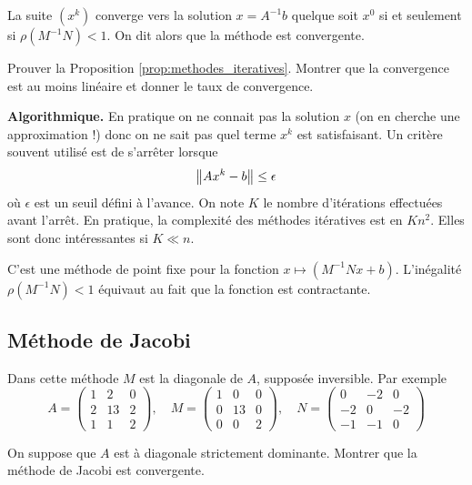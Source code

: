 \begin{proposition}
\label{prop:methodes_iteratives}
La suite $(x^k)$ converge vers la solution $x=A^{-1}b$ quelque soit $x^0$ si
et seulement si $\rho(M^{-1}N) < 1$. On dit alors que la méthode est
convergente.
\end{proposition}

\begin{exercice}
Prouver la Proposition \ref{prop:methodes_iteratives}. Montrer que la
convergence est au moins linéaire et donner le taux de convergence.
\end{exercice}


{\bf Algorithmique.}
En pratique on ne connait pas la solution $x$ (on en cherche une approximation !) donc on ne sait pas quel terme $x^k$ est satisfaisant. Un critère souvent utilisé est de s'arrêter lorsque
\[
\left\|Ax^k-b\right\| \leq \epsilon
\] 
où $\epsilon$ est un seuil défini à l'avance. On note $K$ le nombre d'itérations effectuées avant l'arrêt. En pratique, la complexité des méthodes itératives est en $Kn^2$. Elles sont donc intéressantes si $K \ll n$.

\begin{remark}
C'est une méthode de point fixe pour la fonction $x \mapsto (M^{-1}N x +b)$. L'inégalité $\rho(M^{-1}N) < 1$ équivaut au fait que la fonction est contractante.
\end{remark}


\subsection{Méthode de Jacobi}

Dans cette méthode $M$ est la diagonale de $A$, supposée inversible. Par exemple
\[
A = \left(\begin{array}{ccc}
1 & 2 & 0 \\
2 & 13 & 2 \\
 1 & 1 & 2
\end{array}\right)
, \quad M = \left(\begin{array}{ccc}
1 & 0 & 0 \\
0 & 13 & 0 \\
 0 & 0 & 2
\end{array}\right)
, \quad N = \left(\begin{array}{ccc}
0 & -2 & 0 \\
-2 & 0 & -2 \\
-1 & -1 & 0
\end{array}\right)
\]

\begin{exercice}
On suppose que $A$ est à diagonale strictement dominante. Montrer que la
méthode de Jacobi est convergente.
\end{exercice}

